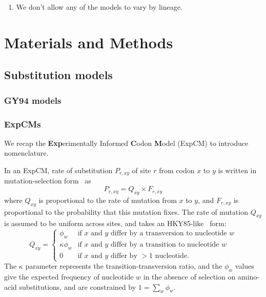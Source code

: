 \documentclass[11pt]{article}
\begin{document}
\begin{enumerate}
  \item We don't allow any of the models to vary by lineage. 
\end{enumerate}

\newpage
\section*{Materials and Methods}

\subsection*{Substitution models}
\subsubsection*{GY94 models}
\subsubsection*{ExpCMs}
We recap the \textbf{Exp}erimentally Informed \textbf{C}odon \textbf{M}odel (ExpCM) \citep{bloom2014experimentally,bloom2014informed,bloom2017identification,hilton2017phydms} to introduce nomenclature. 

In an ExpCM, rate of substitution $P_{r,xy}$ of site $r$ from codon $x$ to $y$ is written in mutation-selection form~\citep{halpern1998evolutionary,mccandlish2014modeling,spielman2015relationship} as
\begin{equation}
P_{r,xy} = Q_{xy} \times F_{r,xy}
\end{equation}
where $Q_{xy}$ is proportional to the rate of mutation from $x$ to $y$, and $F_{r,xy}$ is proportional to the probability that this mutation fixes.
The rate of mutation $Q_{xy}$ is assumed to be uniform across sites, and takes an HKY85-like~\citep{hasegawa1985dating} form:
\begin{equation}
Q_{xy} = 
\begin{cases}
\phi_w & \mbox{if $x$ and $y$ differ by a transversion to nucleotide $w$} \\
\kappa \phi_w & \mbox{if $x$ and $y$ differ by a transition to nucleotide $w$} \\
0 & \mbox{if $x$ and $y$ differ by $>1$ nucleotide.}
\end{cases}
\end{equation}
The $\kappa$ parameter represents the transition-transversion ratio, and the $\phi_w$ values give the expected frequency of nucleotide $w$ in the absence of selection on amino-acid substitutions, and are constrained by $1 = \sum_w \phi_w$.
\end{document}

